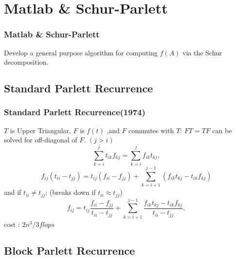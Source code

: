 

\section{Matlab \& Schur-Parlett}


\begin{frame}

\frametitle{Matlab \& Schur-Parlett}
Develop a general purpose algorithm for computing $f(A)$
via the Schur decomposition.
\end{frame}


\subsection{Standard Parlett Recurrence}

\begin{frame}
\frametitle{Standard Parlett Recurrence(1974)}
$T$ is Upper Triangular, $F$ is $f(t)$ ,and $F$ commutes with $T$:\newline
$FT =TF$ can be solved for off-diagonal of $F$. $(j>i)$
\[
\sum_{k = i} ^{j} t_{ik}f_{kj} = \sum_{k=i} ^{j} f_{ik} t_{kj},
\]
\[
f_{ij}(t_{ii} - t_{jj}) = t_{ij}(f_{ii} - f_{jj})+ \sum _{k = i+1} ^{j-1}(f_{ik}t_{kj}-t_{ik}f_{kj})
\]
and if $t_{ii} \neq t_{jj} $: (breaks down if $t_{ii} \approx t_{jj} $)
\[
f_{ij} = t_{ij} \frac {f_{ii} - f_{jj}} {t_{ii} - t_{jj}} + \sum_{k = i+1} ^{j-1} \frac{f_{ik}t_{kj} -t_{ik} f_{kj} } {t_{ii}-t_{jj}},
\]
cost : $2n^3/3 flops$

\end{frame}

\subsection{Block Parlett Recurrence}


